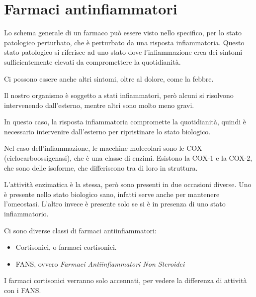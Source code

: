 \chapter{Farmaci antinfiammatori}

Lo schema generale di un farmaco può essere visto nello specifico, per
lo stato patologico perturbato, che è perturbato da una risposta
infiammatoria. Questo stato patologico si riferisce ad uno stato dove
l'infiammazione crea dei sintomi sufficientemente elevati da
compromettere la quotidianità.

Ci possono essere anche altri sintomi, oltre al dolore, come la febbre.

Il nostro organismo è soggetto a stati infiammatori, però alcuni si
risolvono intervenendo dall'esterno, mentre altri sono molto meno gravi.

In questo caso, la risposta infiammatoria compromette la quotidianità,
quindi è necessario intervenire dall'esterno per ripristinare lo stato
biologico.

Nel caso dell'infiammazione, le macchine molecolari sono le COX
(ciclocarboossigenasi), che è una classe di enzimi. Esistono la COX-1 e
la COX-2, che sono delle isoforme, che differiscono tra di loro in
struttura.


L'attività enzimatica è la stessa, però sono presenti in due occasioni
diverse. Uno è presente nello stato biologico sano, infatti serve anche
per mantenere l'omeostasi. L'altro invece è presente solo se si è in
presenza di uno stato infiammatorio.


Ci sono diverse classi di farmaci antiinfiammatori:

\begin{itemize}
\item
Cortisonici, o farmaci cortisonici.
\item
FANS, ovvero \emph{Farmaci Antiinfiammatori Non Steroidei}
\end{itemize}

I farmaci cortisonici verranno solo accennati, per vedere la differenza
di attività con i FANS.



